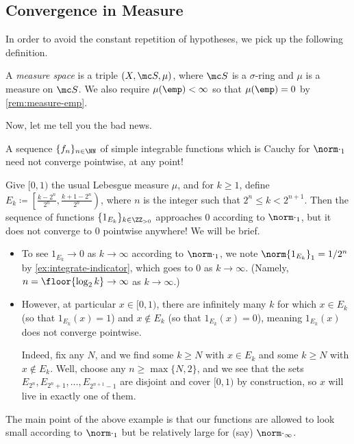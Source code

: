 \documentclass[../notes.tex]{subfiles}
\begin{document}
\subsection{Convergence in Measure}
In order to avoid the constant repetition of hypotheses, we pick up the following definition.
\begin{definition}
	A \textit{measure space} is a triple $(X,\mc S,\mu)$, where $\mc S$ is a $\sigma$-ring and $\mu$ is a measure on $\mc S$. We also require $\mu(\emp)<\infty$ so that $\mu(\emp)=0$ by \autoref{rem:measure-emp}.
\end{definition}
Now, let me tell you the bad news.
\begin{warn}
	A sequence $\{f_n\}_{n\in\NN}$ of simple integrable functions which is Cauchy for $\norm\cdot_1$ need not converge pointwise, at any point!
\end{warn}
\begin{example} \label{ex:the-bad-news}
	Give $[0,1)$ the usual Lebesgue measure $\mu$, and for $k\ge1$, define $E_k\coloneqq\left[\frac{k-2^{n}}{2^{n}},\frac{k+1-2^{n}}{2^{n}}\right)$, where $n$ is the integer such that $2^n\le k<2^{n+1}$. Then the sequence of functions $\{1_{E_k}\}_{k\in\ZZ_{>0}}$ approaches $0$ according to $\norm\cdot_1$, but it does not converge to $0$ pointwise anywhere! We will be brief.
	\begin{itemize}
		\item To see $1_{E_k}\to0$ as $k\to\infty$ according to $\norm\cdot_1$, we note $\norm{1_{E_k}}_1=1/2^n$ by \autoref{ex:integrate-indicator}, which goes to $0$ as $k\to\infty$. (Namely, $n=\floor{\log_2k}\to\infty$ as $k\to\infty$.)
		\item However, at particular $x\in[0,1)$, there are infinitely many $k$ for which $x\in E_k$ (so that $1_{E_k}(x)=1$) and $x\notin E_k$ (so that $1_{E_k}(x)=0$), meaning $1_{E_k}(x)$ does not converge pointwise.
		
		Indeed, fix any $N$, and we find some $k\ge N$ with $x\in E_k$ and some $k\ge N$ with $x\notin E_k$. Well, choose any $n\ge\max\{N,2\}$, and we see that the sets $E_{2^n},E_{2^n+1},\ldots,E_{2^{n+1}-1}$ are disjoint and cover $[0,1)$ by construction, so $x$ will live in exactly one of them.
	\end{itemize}
\end{example}
The main point of the above example is that our functions are allowed to look small according to $\norm\cdot_1$ but be relatively large for (say) $\norm\cdot_\infty$.
\end{document}
